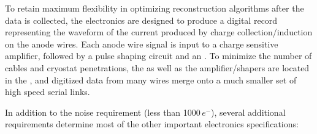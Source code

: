 To retain maximum flexibility in optimizing reconstruction algorithms after 
the  data is collected, the  electronics are designed 
to produce a digital record representing the waveform of the current produced 
by charge collection/induction on the anode wires.  Each anode wire signal is 
input to a charge sensitive amplifier, followed by a pulse shaping circuit and 
an .  To minimize the number of cables and cryostat penetrations, 
the  as well as the amplifier/shapers are located in the , 
and digitized data from many wires merge onto a much smaller set of high speed 
serial links.  

In addition to the noise requirement (less than \num{1000}\,$e^{-}$), several 
additional requirements determine most of the other important  
electronics specifications:

